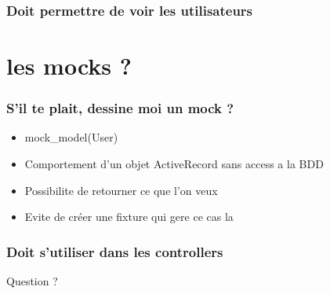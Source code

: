 \documentclass{beamer}
\begin{document}
\begin{frame}
    \frametitle{Doit permettre de voir les utilisateurs}
    \begin{center}
        
    \end{center}
\end{frame}

\section{les mocks ?}

\begin{frame}
  \frametitle{S'il te plait, dessine moi un mock ?}
  \begin{itemize}
    \item mock\_model(User)
    \item Comportement d'un objet ActiveRecord sans access a la BDD
    \item Possibilite de retourner ce que l'on veux
    \item Evite de créer une fixture qui gere ce cas la
  \end{itemize}
\end{frame}

\begin{frame}
  \frametitle{Doit s'utiliser dans les controllers}
  \begin{center}
    
  \end{center}
\end{frame}

\begin{frame}
    \begin{center}
    \huge{}
    Question ?
    \end{center}
\end{frame}
\end{document}
